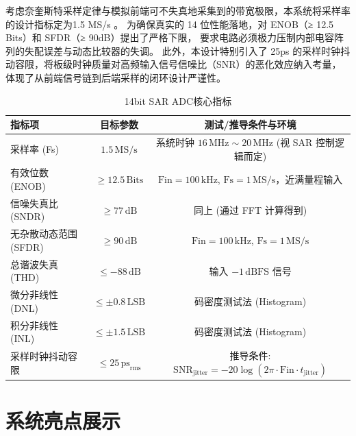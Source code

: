 考虑奈奎斯特采样定律与模拟前端可不失真地采集到的带宽极限，本系统将采样率的设计指标定为1.5 MS/s 。
为确保真实的 14 位性能落地，对 ENOB（≥ 12.5 Bits）和 SFDR（≥ 90dB）提出了严格下限，
要求电路必须极力压制内部电容阵列的失配误差与动态比较器的失调。
此外，本设计特别引入了 25ps 的采样时钟抖动容限，将板级时钟质量对高频输入信号信噪比（SNR）的恶化效应纳入考量，
体现了从前端信号链到后端采样的闭环设计严谨性。
\begin{table}[htbp]
  \centering
  \caption{14bit SAR ADC核心指标}
  \begin{tabular}{lcc}
    \toprule
    指标项 & 目标参数 & 测试/推导条件与环境 \\
    \midrule
    采样率 (Fs) & $1.5\,\text{MS/s}$ & 系统时钟 $16\,\text{MHz} \sim 20\,\text{MHz}$ (视 SAR 控制逻辑而定) \\
    有效位数 (ENOB) & $\ge 12.5\,\text{Bits}$ & $\text{Fin} = 100\,\text{kHz}$, $\text{Fs} = 1\,\text{MS/s}$，近满量程输入 \\
    信噪失真比 (SNDR) & $\ge 77\,\text{dB}$ & 同上 (通过 FFT 计算得到) \\
    无杂散动态范围 (SFDR) & $\ge 90\,\text{dB}$ & $\text{Fin} = 100\,\text{kHz}$, $\text{Fs} = 1\,\text{MS/s}$ \\
    总谐波失真 (THD) & $\le -88\,\text{dB}$ & 输入 $-1\,\text{dBFS}$ 信号 \\
    微分非线性 (DNL) & $\le \pm 0.8\,\text{LSB}$ & 码密度测试法 (Histogram) \\
    积分非线性 (INL) & $\le \pm 1.5\,\text{LSB}$ & 码密度测试法 (Histogram) \\
    采样时钟抖动容限 & $\le 25\,\text{ps}_\text{rms}$ & 推导条件: $\text{SNR}_\text{jitter} = -20\log(2\pi \cdot \text{Fin} \cdot t_\text{jitter})$ \\
    \bottomrule
  \end{tabular}
  \label{tab:sar_adc_spec}
\end{table}




\section{系统亮点展示}




